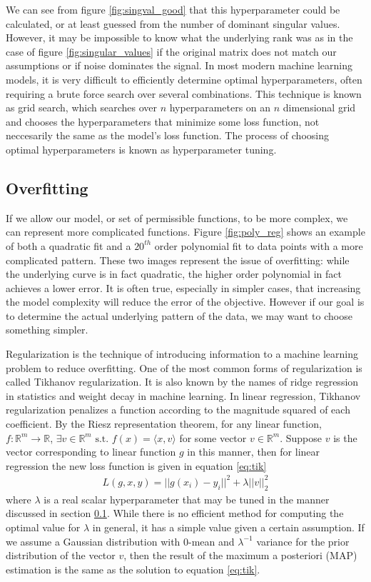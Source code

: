 We can see from figure \ref{fig:singval_good} that this hyperparameter could be calculated, or at least guessed from the number of dominant singular values.  However, it may be impossible to know what the underlying rank was as in the case of figure \ref{fig:singular_values} if the original matrix does not match our assumptions or if noise dominates the signal.  In most modern machine learning models, it is very difficult to efficiently determine optimal hyperparameters, often requiring a brute force search over several combinations.  This technique is known as grid search, which searches over $n$ hyperparameters on an $n$ dimensional grid and chooses the hyperparameters that minimize some loss function, not neccesarily the same as the model's loss function.  The process of choosing optimal hyperparameters is known as hyperparameter tuning.

\subsection{Overfitting} \label{sec:overfitting}
If we allow our model, or set of permissible functions, to be more complex, we can represent more complicated functions.  Figure \ref{fig:poly_reg} shows an example of both a quadratic fit and a $20^{th}$ order polynomial fit to data points with a more complicated pattern.  These two images represent the issue of overfitting: while the underlying curve is in fact quadratic, the higher order polynomial in fact achieves a lower error.  It is often true, especially in simpler cases, that increasing the model complexity will reduce the error of the objective.  However if our goal is to determine the actual underlying pattern of the data, we may want to choose something simpler.

Regularization is the technique of introducing information to a machine learning problem to reduce overfitting.  One of the most common forms of regularization is called Tikhanov regularization.  It is also known by the names of ridge regression in statistics and weight decay in machine learning.  In linear regression, Tikhanov regularization penalizes a function according to the magnitude squared of each coefficient.  By the Riesz representation theorem, for any linear function, $f: \mathbb{R}^m \rightarrow \mathbb{R}$, $\exists v\in\mathbb{R}^m \text{ s.t. } f(x) = \langle x,v\rangle $ for some vector $v\in \mathbb{R}^m$.  Suppose $v$ is the vector corresponding to linear function $g$ in this manner, then for linear regression the new loss function is given in equation \ref{eq:tik}
\begin{align}\label{eq:tik}
L(g,x,y) = ||g(x_i)-y_i||^2 + \lambda ||v||_2^2
\end{align}
where $\lambda$ is a real scalar hyperparameter that may be tuned in the manner discussed in section \ref{sec:overfitting}.  While there is no efficient method for computing the optimal value for $\lambda$ in general, it has a simple value given a certain assumption.  If we assume a Gaussian distribution with 0-mean and $\lambda^{-1}$ variance for the prior distribution of the vector $v$, then the result of the maximum a posteriori (MAP) estimation is the same as the solution to equation \ref{eq:tik}.

